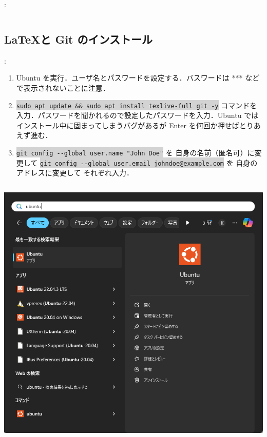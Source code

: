 \documentclass[aspectratio=169,dvipdfmx,cjk]{beamer}
\newcommand{\cmdline}[1]{
    \colorbox{lightgray}{\lstinline[style=command]{#1}}
}
\newcommand{\blue}[1]{ {\color{blue} #1} }
\begin{document}
\begin{frame}{\insertsection \thesubsection: \insertsubsection}
\begin{columns}
\begin{column}{0.4\textwidth}
    \end{column}
  \end{columns}
\end{frame}

\subsection{\LaTeX と Git のインストール}
\begin{frame}{\insertsection \thesubsection: \insertsubsection}
  \begin{enumerate}
    \item Ubuntu を実行．ユーザ名とパスワードを設定する．{\tiny バスワードは *** などで表示されないことに注意．}
    \item \cmdline{sudo apt update && sudo apt install texlive-full git -y} コマンドを入力．パスワードを聞かれるので設定したパスワードを入力．Ubuntu ではインストール中に固まってしまうバグがあるが Enter を何回か押せばとりあえず進む\cite{LaTeXBug}．
    \item \cmdline{git config --global user.name "John Doe"} を\blue{自身の名前（匿名可）に変更して} \cmdline{git config --global user.email johndoe@example.com} を\blue{自身のアドレスに変更して}それぞれ入力\cite{GitBook}．
  \end{enumerate}
  \begin{columns}
    \begin{column}{0.2\textwidth}
        \includegraphics[width=1.0\linewidth]{fig/start-ubuntu.png}

\end{column}
\end{columns}
\end{frame}
\end{document}
